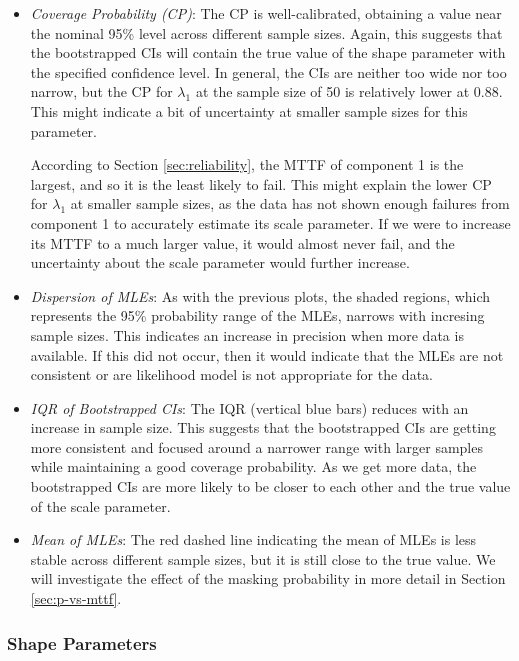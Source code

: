 \documentclass[
]{article}
\begin{document}
\begin{itemize}
\item
  \emph{Coverage Probability (CP)}: The CP is well-calibrated, obtaining
  a value near the nominal 95\% level across different sample sizes.
  Again, this suggests that the bootstrapped CIs will contain the true
  value of the shape parameter with the specified confidence level. In
  general, the CIs are neither too wide nor too narrow, but the CP for
  \(\lambda_1\) at the sample size of 50 is relatively lower at 0.88.
  This might indicate a bit of uncertainty at smaller sample sizes for
  this parameter.

  According to Section \ref{sec:reliability}, the MTTF of component 1 is
  the largest, and so it is the least likely to fail. This might explain
  the lower CP for \(\lambda_1\) at smaller sample sizes, as the data
  has not shown enough failures from component 1 to accurately estimate
  its scale parameter. If we were to increase its MTTF to a much larger
  value, it would almost never fail, and the uncertainty about the scale
  parameter would further increase.
\item
  \emph{Dispersion of MLEs}: As with the previous plots, the shaded
  regions, which represents the 95\% probability range of the MLEs,
  narrows with incresing sample sizes. This indicates an increase in
  precision when more data is available. If this did not occur, then it
  would indicate that the MLEs are not consistent or are likelihood
  model is not appropriate for the data.
\item
  \emph{IQR of Bootstrapped CIs}: The IQR (vertical blue bars) reduces
  with an increase in sample size. This suggests that the bootstrapped
  CIs are getting more consistent and focused around a narrower range
  with larger samples while maintaining a good coverage probability. As
  we get more data, the bootstrapped CIs are more likely to be closer to
  each other and the true value of the scale parameter.
\item
  \emph{Mean of MLEs}: The red dashed line indicating the mean of MLEs
  is less stable across different sample sizes, but it is still close to
  the true value. We will investigate the effect of the masking
  probability in more detail in Section \ref{sec:p-vs-mttf}.
\end{itemize}

\hypertarget{shape-parameters}{%
\subsubsection{Shape Parameters}\label{shape-parameters}}
\end{document}
